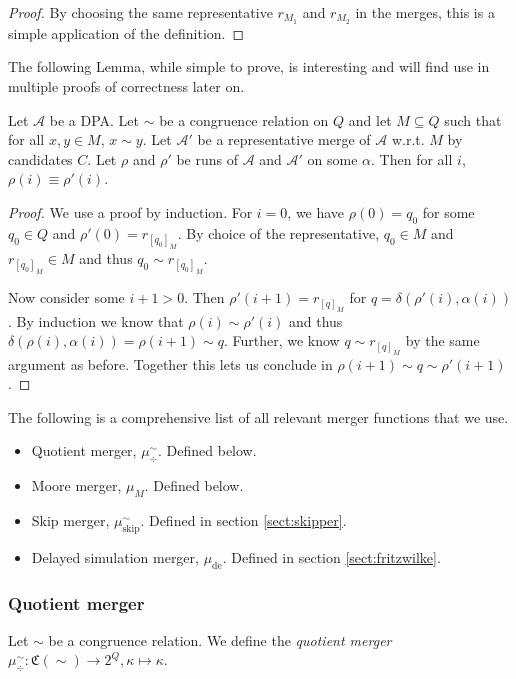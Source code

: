 \begin{proof}
	By choosing the same representative $r_{M_1}$ and $r_{M_2}$ in the merges, this is a simple application of the definition.
\end{proof}

The following Lemma, while simple to prove, is interesting and will find use in multiple proofs of correctness later on.

\begin{lem}
	Let $\mathcal{A}$ be a DPA. Let $\sim$ be a congruence relation on $Q$ and let $M \subseteq Q$ such that for all $x, y \in M$, $x \sim y$. Let $\mathcal{A}'$ be a representative merge of $\mathcal{A}$ w.r.t. $M$ by candidates $C$. Let $\rho$ and $\rho'$ be runs of $\mathcal{A}$ and $\mathcal{A}'$ on some $\alpha$. Then for all $i$, $\rho(i) \equiv \rho'(i)$.
	\label{lem:general:cong_stays_in_merge}
\end{lem}

\begin{proof}
	We use a proof by induction. For $i = 0$, we have $\rho(0) = q_0$ for some $q_0 \in Q$ and $\rho'(0) = r_{[q_0]_M}$. By choice of the representative, $q_0 \in M$ and $r_{[q_0]_M} \in M$ and thus $q_0 \sim r_{[q_0]_M}$.
	
	Now consider some $i+1 > 0$. Then $\rho'(i+1) = r_{[q]_M}$ for $q = \delta(\rho'(i), \alpha(i))$. By induction we know that $\rho(i) \sim \rho'(i)$ and thus $\delta(\rho(i), \alpha(i)) = \rho(i+1) \sim q$. Further, we know $q \sim r_{[q]_M}$ by the same argument as before. Together this lets us conclude in $\rho(i+1) \sim q \sim \rho'(i+1)$.
\end{proof}

The following is a comprehensive list of all relevant merger functions that we use.

\begin{itemize}
	\item Quotient merger, $\mu_\div^\sim$. Defined below.
	\item Moore merger, $\mu_M$. Defined below.
	\item Skip merger, $\mu_\text{skip}^\sim$. Defined in section \ref{sect:skipper}.
	\item Delayed simulation merger, $\mu_\text{de}$. Defined in section \ref{sect:fritzwilke}.
\end{itemize}

\vspace{5pt}

\subsubsection{Quotient merger}
\begin{defn}
	Let $\sim$ be a congruence relation. We define the \emph{quotient merger} $\mu^\sim_\div : \mathfrak{C}(\sim) \rightarrow 2^Q, \kappa \mapsto \kappa$. 
\end{defn}

